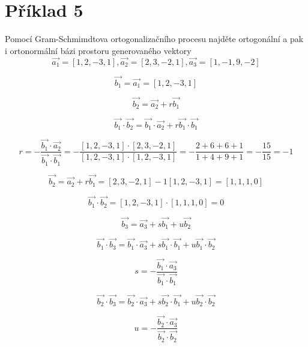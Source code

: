 \section*{Příklad 5}
Pomocí Gram-Schmimdtova ortogonalizačního procesu najděte ortogonální a pak i ortonormální bázi prostoru generovaného vektory
$$
  \vec{a_1} = [1, 2, -3, 1],
  \vec{a_2} = [2,3, -2, 1],
  \vec{a_3} = [1, -1, 9, -2]
$$

$$
  \vec{b_1} = \vec{a_1} = [1, 2, -3, 1]
$$

$$
  \vec{b_2} = \vec{a_2} + r \vec{b_1}
$$

$$
  \vec{b_1} \cdot \vec{b_2} = \vec{b_1} \cdot \vec{a_2} + r \vec{b_1} \cdot \vec{b_1}
$$

$$
  r = - \frac{\vec{b_1} \cdot \vec{a_2}}{\vec{b_1} \cdot \vec{b_1}}
  = - \frac{[1, 2, -3, 1] \cdot [2,3, -2, 1]}{[1, 2, -3, 1] \cdot [1, 2, -3, 1]}
  = - \frac{2 + 6 + 6 + 1}{1 + 4 + 9 + 1}
  = - \frac{15}{15}
  = -1
$$

$$
  \vec{b_2} = \vec{a_2} + r \vec{b_1} = [2,3, -2, 1] - 1 [1, 2, -3, 1] = [1, 1, 1, 0]
$$

$$
  \vec{b_1} \cdot \vec{b_2} = [1, 2, -3, 1] \cdot [1, 1, 1, 0] = 0
$$

$$
  \vec{b_3} = \vec{a_3} + s \vec{b_1} + u \vec{b_2}
$$

$$
  \vec{b_1} \cdot \vec{b_3} = \vec{b_1} \cdot \vec{a_3} + s \vec{b_1} \cdot \vec{b_1} + u \vec{b_1} \cdot \vec{b_2}
$$

$$
  s = - \frac{\vec{b_1} \cdot \vec{a_3}}{\vec{b_1} \cdot \vec{b_1}}
$$

$$
  \vec{b_2} \cdot \vec{b_3} = \vec{b_2} \cdot \vec{a_3} + s \vec{b_2} \cdot \vec{b_1} + u \vec{b_2} \cdot \vec{b_2}
$$

$$
  u = - \frac{\vec{b_2} \cdot \vec{a_3}}{\vec{b_2} \cdot \vec{b_2}}
$$
